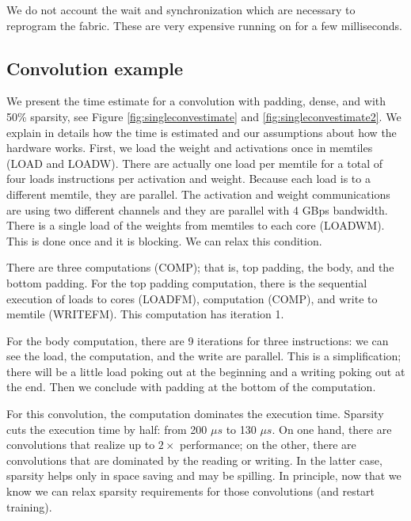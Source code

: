 \documentclass{IEEEtran}
\begin{document}
We do not account the wait and synchronization which are necessary to
reprogram the fabric. These are very expensive running on for a few
milliseconds.


\subsection{Convolution example}

We present the time estimate for a convolution with padding, dense,
and with 50\% sparsity, see Figure \ref{fig:singleconvestimate} and
\ref{fig:singleconvestimate2}.  We explain in details how the time is
estimated and our assumptions about how the hardware works. First, we
load the weight and activations once in memtiles (LOAD and
LOADW). There are actually one load per memtile for a total of four
loads instructions per activation and weight. Because each load is to
a different memtile, they are parallel.  The activation and weight
communications are using two different channels and they are parallel
with 4 GBps bandwidth.  There is a single load of the weights from
memtiles to each core (LOADWM). This is done once and it is
blocking. We can relax this condition.



There are three computations (COMP); that is, top padding, the body,
and the bottom padding. For the top padding computation, there is the
sequential execution of loads to cores (LOADFM), computation (COMP),
and write to memtile (WRITEFM). This computation has iteration 1.

For the body computation, there are 9 iterations for three
instructions: we can see the load, the computation, and the write are
parallel. This is a simplification; there will be a little load poking
out at the beginning and a writing poking out at the end.  Then we
conclude with padding at the bottom of the computation.

For this convolution, the computation dominates the execution
time. Sparsity cuts the execution time by half: from 200 $\mu s$ to
130 $\mu s$. On one hand, there are convolutions that realize up to
$2\times$ performance; on the other, there are convolutions that are
dominated by the reading or writing. In the latter case, sparsity
helps only in space saving and may be spilling. In principle, now that
we know we can relax sparsity requirements for those convolutions (and
restart training).
\end{document}
